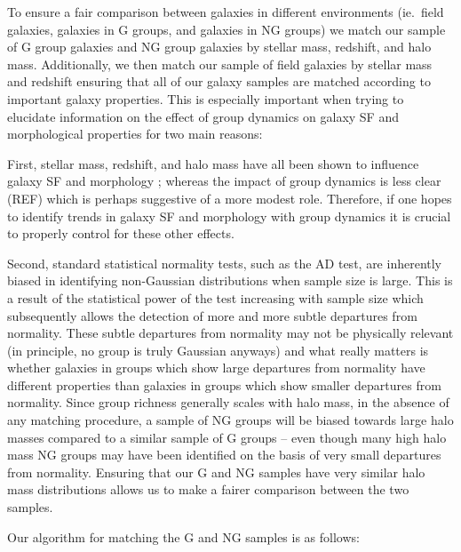 \documentclass[a4paper,fleqn,usenatbib]{mnras}
\begin{document}
To ensure a fair comparison between galaxies in different environments
(ie.\ field galaxies, galaxies in G groups, and galaxies in NG groups)
we match our sample of G group galaxies and NG group galaxies by
stellar mass, redshift, and halo mass.  Additionally, we then match
our sample of field galaxies by stellar mass and redshift ensuring
that all of our galaxy samples are matched according to important galaxy
properties.  This is especially important when trying to elucidate
information on the effect of group dynamics on galaxy SF and
morphological properties for
two main reasons:
\par
First, stellar mass, redshift, and halo mass have
all been shown to influence galaxy SF and morphology
\citep[e.g.][]{brinchmann2004, feulner2005, zheng2007, cucciati2012, wetzel2012, lackner2013, tasca2014}; whereas
the impact of group dynamics is less clear \citep{hou2013, ribeiro2013} (REF) which is perhaps
suggestive of a more modest role.  Therefore,
if one hopes to identify trends in galaxy SF and morphology with group
dynamics it is crucial to properly control for these other effects.
\par
Second, standard statistical normality tests, such as the AD test, are
inherently biased in identifying non-Gaussian distributions when
sample size is large.  This is a result of the statistical power of
the test increasing with sample size which subsequently allows the
detection of more and more subtle departures from normality.  These subtle
departures from normality may not be physically relevant (in
principle, no group is truly Gaussian anyways) and what really matters is
whether galaxies in groups which show large departures from normality
have different properties than galaxies in groups which show smaller
departures from normality. Since group
richness generally scales with halo mass, in the absence of any matching
procedure, a sample of NG groups will be biased towards large halo
masses compared to a similar sample of G groups -- even though many
high halo mass NG groups may have been identified on the basis of very
small departures from normality.  Ensuring that our G and NG
samples have very similar halo mass distributions allows us to make a
fairer comparison between the two samples.
\par
Our algorithm for matching the G and NG samples is as follows:
\end{document}

